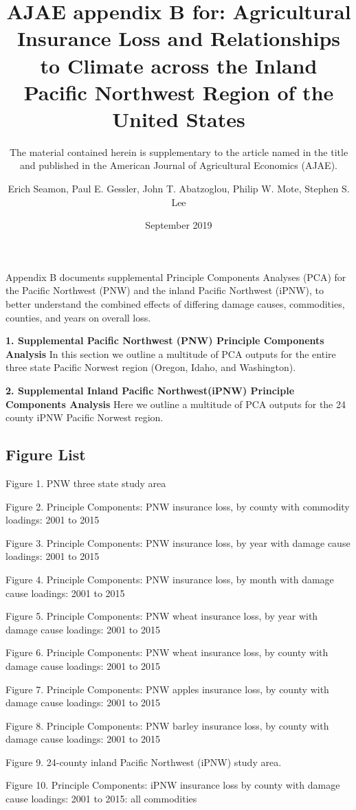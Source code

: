 \documentclass[]{article}
\title{AJAE appendix B for: Agricultural Insurance Loss and Relationships to
Climate across the Inland Pacific Northwest Region of the United States}
\subtitle{The material contained herein is supplementary to the article named in
the title and published in the American Journal of Agricultural
Economics (AJAE).}
\author{Erich Seamon, Paul E. Gessler, John T. Abatzoglou, Philip W. Mote,
Stephen S. Lee}
\date{September 2019}
\begin{document}
\maketitle

Appendix B documents supplemental Principle Components Analyses (PCA)
for the Pacific Northwest (PNW) and the inland Pacific Northwest (iPNW),
to better understand the combined effects of differing damage causes,
commodities, counties, and years on overall loss.

\textbf{1. Supplemental Pacific Northwest (PNW) Principle Components
Analysis} In this section we outline a multitude of PCA outputs for the
entire three state Pacific Norwest region (Oregon, Idaho, and
Washington).

\textbf{2. Supplemental Inland Pacific Northwest(iPNW) Principle
Components Analysis} Here we outline a multitude of PCA outputs for the
24 county iPNW Pacific Norwest region.

\newpage

\hypertarget{figure-list}{%
\subsection{Figure List}\label{figure-list}}

Figure 1. PNW three state study area

Figure 2. Principle Components: PNW insurance loss, by county with
commodity loadings: 2001 to 2015

Figure 3. Principle Components: PNW insurance loss, by year with damage
cause loadings: 2001 to 2015

Figure 4. Principle Components: PNW insurance loss, by month with damage
cause loadings: 2001 to 2015

Figure 5. Principle Components: PNW wheat insurance loss, by year with
damage cause loadings: 2001 to 2015

Figure 6. Principle Components: PNW wheat insurance loss, by county with
damage cause loadings: 2001 to 2015

Figure 7. Principle Components: PNW apples insurance loss, by county
with damage cause loadings: 2001 to 2015

Figure 8. Principle Components: PNW barley insurance loss, by county
with damage cause loadings: 2001 to 2015

Figure 9. 24-county inland Pacific Northwest (iPNW) study area.

Figure 10. Principle Components: iPNW insurance loss by county with
damage cause loadings: 2001 to 2015: all commodities
\end{document}

